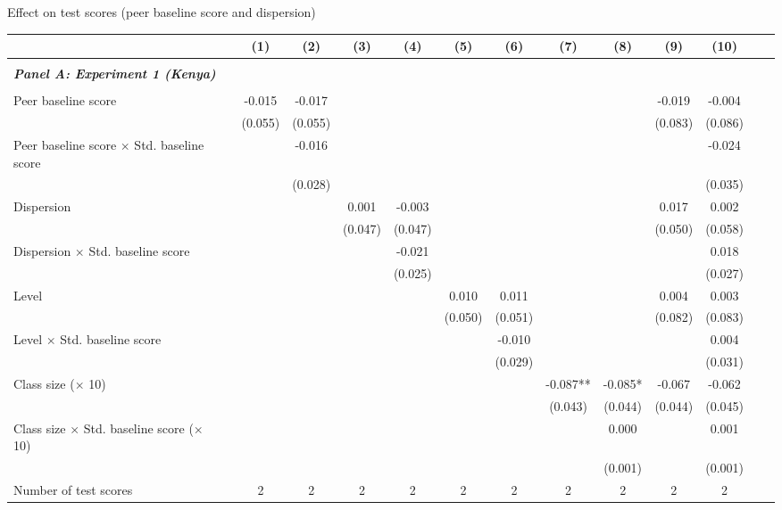 \begin{center} 
\caption{\small Effect on test scores (peer baseline score and dispersion)} 
\label{tab:descriptives} 
\begin{scriptsize}
\begin{threeparttable}
\begin{tabular} {@{} l l c c c c c c c c c c c  c@{}} \toprule \toprule
& &(1)&(2)&(3)&(4)&(5)&(6)&(7)&(8)&(9)&(10) \\ \midrule 
\\
\multicolumn{3}{l}{\textbf{\textit{Panel A: Experiment 1 (Kenya)}}} \\
\\
Peer baseline score &  & -0.015 & -0.017 &  &  &  &  &  &  & -0.019 & -0.004 \\
                 &  & (0.055) & (0.055) &  &  &  &  &  &  & (0.083) & (0.086) \\
Peer baseline score $\times$ Std. baseline score &  &  & -0.016 &  &  &  &  &  &  &  & -0.024 \\
                 &  &  & (0.028) &  &  &  &  &  &  &  & (0.035) \\
Dispersion &  &  &  & 0.001 & -0.003 &  &  &  &  & 0.017 & 0.002 \\
                 &  &  &  & (0.047) & (0.047) &  &  &  &  & (0.050) & (0.058) \\
Dispersion $\times$ Std. baseline score &  &  &  &  & -0.021 &  &  &  &  &  & 0.018 \\
                 &  &  &  &  & (0.025) &  &  &  &  &  & (0.027) \\
Level &  &  &  &  &  & 0.010 & 0.011 &  &  & 0.004 & 0.003 \\
                 &  &  &  &  &  & (0.050) & (0.051) &  &  & (0.082) & (0.083) \\
Level $\times$ Std. baseline score &  &  &  &  &  &  & -0.010 &  &  &  & 0.004 \\
                 &  &  &  &  &  &  & (0.029) &  &  &  & (0.031) \\
Class size ($\times$ 10) &  &  &  &  &  &  &  & -0.087** & -0.085* & -0.067 & -0.062 \\
                 &  &  &  &  &  &  &  & (0.043) & (0.044) & (0.044) & (0.045) \\
Class size $\times$ Std. baseline score ($\times$ 10) &  &  &  &  &  &  &  &  & 0.000 &  & 0.001 \\
                 &  &  &  &  &  &  &  &  & (0.001) &  & (0.001) \\
\midrule
Number of test scores &  & 2 & 2 & 2 & 2 & 2 & 2 & 2 & 2 & 2 & 2 \\

\end{tabular}
\end{threeparttable}
\end{scriptsize}
\end{center}
